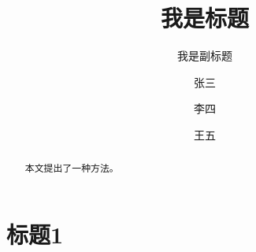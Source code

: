 \documentclass{cpp}
\title{我是标题}
\subtitle{我是副标题}
\author[1]{张三}
\author[2]{李四}
\author[2]{王五}
\affil[1]{单位1}
\affil[2]{单位2}
\begin{document}
\maketitle

\begin{abstract}
本文提出了一种方法。
\end{abstract}

\section{标题1}
\citep{Bottou:2018cv}



\end{document}
